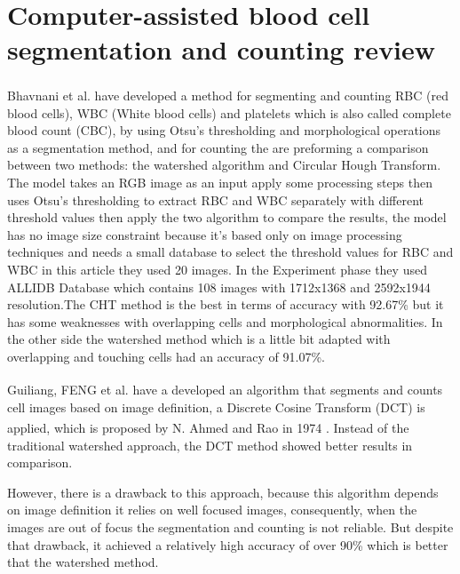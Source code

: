 {\section{Computer-assisted blood cell segmentation and counting review}
\hspace{\parindent}
Bhavnani et al. \textsuperscript{\cite{bhavnani2016segmentation}} have developed a method for segmenting and counting RBC (red blood cells), WBC (White blood cells) and platelets which is also called complete blood count (CBC), by using Otsu’s thresholding and morphological operations as a segmentation method, and for counting the are preforming a comparison between two methods: the watershed algorithm and Circular Hough Transform. The model takes an RGB image as an input apply some processing steps then uses Otsu's thresholding to extract RBC and WBC separately with different threshold values then apply the two algorithm to compare the results, the model has no image size constraint because it's based only on image processing techniques and needs a small database to select the threshold values for RBC and WBC in this article they used 20 images. In the Experiment phase they used ALLIDB Database which contains 108 images with 1712x1368 and 2592x1944 resolution.The CHT method is the best in terms of accuracy with 92.67\% but it has some weaknesses with overlapping cells and morphological abnormalities. In the other side the watershed method which is a little bit adapted with overlapping and touching cells had an accuracy of 91.07\%.\

Guiliang, FENG et al. \textsuperscript{\cite{guiliang2016microscopic}} have a developed an algorithm that segments and counts cell images based on image definition, a Discrete Cosine Transform (DCT) is applied, which is proposed by N. Ahmed and Rao in 1974 \textsuperscript{\cite{ahmed1974discrete}}. Instead of the traditional watershed approach, the DCT method showed better results in comparison.\

However, there is a drawback to this approach, because this algorithm depends on image definition it relies on well focused images, consequently, when the images are out of focus the segmentation and counting is not reliable. But despite that drawback, it achieved a relatively high accuracy of over 90\% which is better that the watershed method.\\

}
